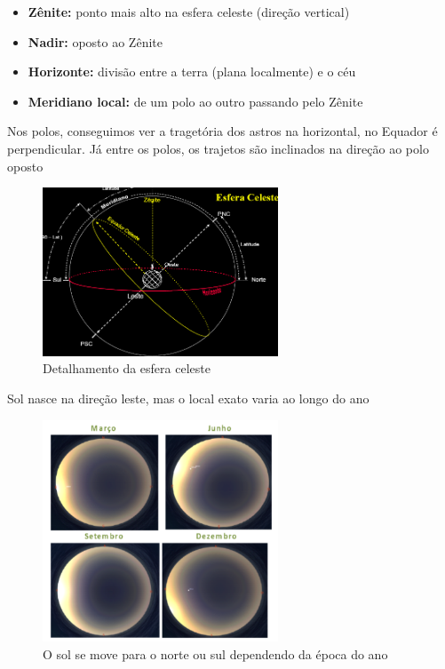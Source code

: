 \documentclass{article}
\begin{document}
\begin{itemize}
    \item \textbf{Zênite:} ponto mais alto na esfera celeste (direção vertical)
    \item \textbf{Nadir:} oposto ao Zênite 
    \item \textbf{Horizonte:} divisão entre a terra (plana localmente) e o céu  
    \item \textbf{Meridiano local:} de um polo ao outro passando pelo Zênite
\end{itemize}

Nos polos, conseguimos ver a tragetória dos astros na horizontal, no
Equador é perpendicular. Já entre os polos, os trajetos são inclinados na 
direção ao polo oposto

\begin{figure}[H]
    \centering
    \includegraphics[width=7cm]{imagens/esfera_det.png}
    \caption{Detalhamento da esfera celeste}
\end{figure}

Sol nasce na direção leste, mas o local exato varia ao longo do ano 

\begin{figure}[H]
    \centering
    \includegraphics[width=7cm]{imagens/mov_sol.png}
    \caption{O sol se move para o norte ou sul dependendo da época do ano}
\end{figure}
\end{document}
